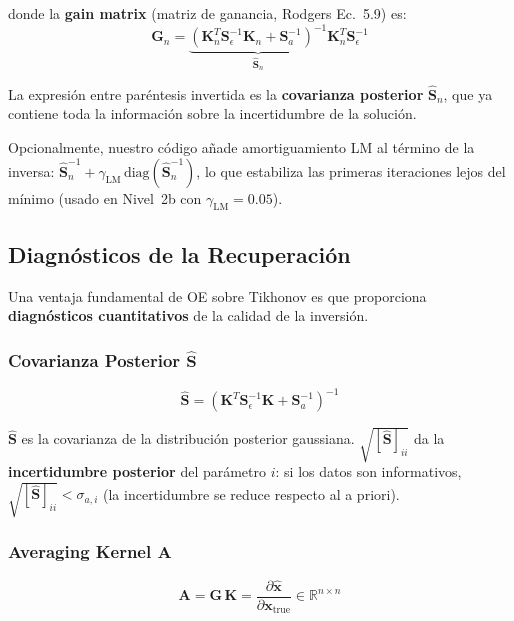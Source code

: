 \documentclass[a4paper,11pt]{article}
\begin{document}
donde la \textbf{gain matrix} (matriz de ganancia, Rodgers Ec.~5.9) es:
\begin{equation}\label{eq:gain}
    \mathbf{G}_n = \underbrace{\left(\mathbf{K}_n^T\mathbf{S}_\epsilon^{-1}\mathbf{K}_n
    + \mathbf{S}_a^{-1}\right)^{-1}}_{\hat{\mathbf{S}}_n}\mathbf{K}_n^T\mathbf{S}_\epsilon^{-1}
\end{equation}

La expresi\'on entre par\'entesis invertida es la \textbf{covarianza posterior}
$\hat{\mathbf{S}}_n$, que ya contiene toda la informaci\'on sobre la
incertidumbre de la soluci\'on.

Opcionalmente, nuestro c\'odigo a\~nade amortiguamiento LM al t\'ermino
de la inversa: $\hat{\mathbf{S}}_n^{-1} + \gamma_{\text{LM}}\,
\text{diag}(\hat{\mathbf{S}}_n^{-1})$, lo que estabiliza las primeras
iteraciones lejos del m\'inimo (usado en Nivel~2b con $\gamma_{\text{LM}} = 0.05$).

\subsection{Diagn\'osticos de la Recuperaci\'on}

Una ventaja fundamental de OE sobre Tikhonov es que proporciona
\textbf{diagn\'osticos cuantitativos} de la calidad de la inversi\'on.

\subsubsection{Covarianza Posterior $\hat{\mathbf{S}}$}

\begin{equation}
    \hat{\mathbf{S}} = \left(\mathbf{K}^T\mathbf{S}_\epsilon^{-1}\mathbf{K}
    + \mathbf{S}_a^{-1}\right)^{-1}
\end{equation}

$\hat{\mathbf{S}}$ es la covarianza de la distribuci\'on posterior gaussiana.
$\sqrt{[\hat{\mathbf{S}}]_{ii}}$ da la \textbf{incertidumbre posterior} del
par\'ametro $i$: si los datos son informativos, $\sqrt{[\hat{\mathbf{S}}]_{ii}}
< \sigma_{a,i}$ (la incertidumbre se reduce respecto al a priori).

\subsubsection{Averaging Kernel $\mathbf{A}$}

\begin{equation}
    \mathbf{A} = \mathbf{G}\,\mathbf{K} = \frac{\partial\hat{\mathbf{x}}}{\partial\mathbf{x}_{\text{true}}}
    \in \mathbb{R}^{n \times n}
\end{equation}
\end{document}
